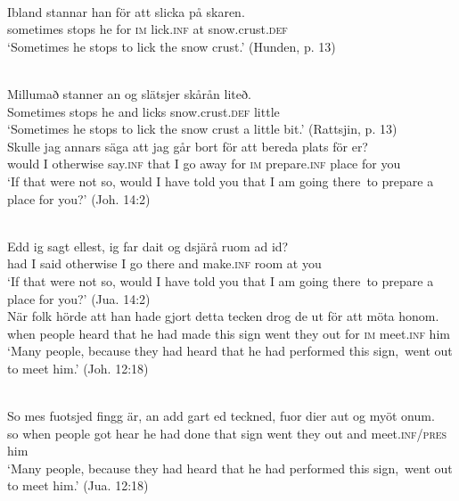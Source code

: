 \documentclass[output=paper]{langscibook}
\begin{document}
\ea
\label{ex:kalm:17}
\ea {}\label{ex:kalm:17a}\\
\gll Ibland stannar han för att slicka på skaren.\\
sometimes stops he for \textsc{im} lick.\textsc{inf} at snow.crust.\textsc{def}\\
\glt ‘Sometimes he stops to lick the snow crust.’ (Hunden, p. 13)

\ex {}\label{ex:kalm:17b}\\ 
\gll Millumað stanner an og slätsjer skårån liteð.\\
Sometimes stops he and licks snow.crust.\textsc{def} little\\
\glt ‘Sometimes he stops to lick the snow crust a little bit.’ (Rattsjin, p. 13)
\z 
\ex
\label{ex:kalm:18}
\ea {}\label{ex:kalm:18a}\\
\gll Skulle jag annars säga att jag går bort för att bereda plats för er?\\
would I otherwise say.\textsc{inf} that I go away for \textsc{im} prepare.\textsc{inf} place for you\\
\glt ‘If that were not so, would I have told you that I am going there{~}to prepare a place for you?’ (Joh. 14:2)

\ex {}\label{ex:kalm:18b}\\
\gll Edd ig sagt ellest, ig far dait og dsjärå ruom ad id?\\
had I said otherwise I go there and make.\textsc{inf} room at you\\
 \glt ‘If that were not so, would I have told you that I am going there{~}to prepare a place for you?’ (Jua. 14:2)
\z 
\ex
\label{ex:kalm:19}
\ea {}\label{ex:kalm:19a}\\
\gll När folk hörde att han hade gjort detta tecken drog de ut för att möta honom.\\
when people heard that he had made this sign went they out for \textsc{im} meet.\textsc{inf} him\\
\glt ‘Many people, because they had heard that he had performed this sign,{~}went out to meet him.’ (Joh. 12:18)

\ex {}\label{ex:kalm:19b}\\
\gll So mes fuotsjed fingg är, an add gart ed teckned, fuor dier aut og myöt onum.\\
so when people got hear he had done that sign went they out and meet.\textsc{inf/pres} him\\
\glt ‘Many people, because they had heard that he had performed this sign,{~}went out to meet him.’ (Jua. 12:18)
\z 
\z 
\end{document}
